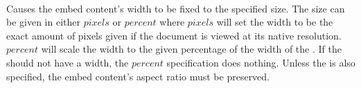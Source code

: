  \\

Causes the embed content's width to be fixed to the specified size. The size can be given in either \inline$pixels$ or \inline$percent$ where \inline$pixels$ will set the width to be the exact amount of pixels given if the document is viewed at its native resolution. \inline$percent$ will scale the width to the given percentage of the width of the . If the  should not have a width, the \inline$percent$ specification does nothing. Unless the  is also specified, the embed content's aspect ratio must be preserved. \\

